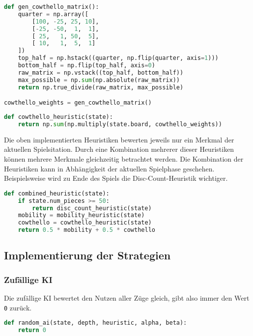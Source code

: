 \begin{lstlisting}[language=Python]
def gen_cowthello_matrix():
    quarter = np.array([
        [100, -25, 25, 10],
        [-25, -50,  1,  1],
        [ 25,   1, 50,  5],
        [ 10,   1,  5,  1]
    ])
    top_half = np.hstack((quarter, np.flip(quarter, axis=1)))
    bottom_half = np.flip(top_half, axis=0)
    raw_matrix = np.vstack((top_half, bottom_half))
    max_possible = np.sum(np.absolute(raw_matrix))
    return np.true_divide(raw_matrix, max_possible)

cowthello_weights = gen_cowthello_matrix()
\end{lstlisting}

\begin{lstlisting}[language=Python]
def cowthello_heuristic(state):
    return np.sum(np.multiply(state.board, cowthello_weights))
\end{lstlisting}

Die oben implementierten Heuristiken bewerten jeweils nur ein Merkmal
der aktuellen Spielsitation. Durch eine Kombination mehrerer dieser
Heuristiken können mehrere Merkmale gleichzeitig betrachtet werden. Die
Kombination der Heuristiken kann in Abhängigkeit der aktuellen
Spielphase geschehen. Beispielsweise wird zu Ende des Spiels die
Disc-Count-Heuristik wichtiger.

\begin{lstlisting}[language=Python]
def combined_heuristic(state):
    if state.num_pieces >= 50:
        return disc_count_heuristic(state)
    mobility = mobility_heuristic(state)
    cowthello = cowthello_heuristic(state)
    return 0.5 * mobility + 0.5 * cowthello
\end{lstlisting}

\hypertarget{implementierung-der-strategien}{%
\subsection{Implementierung der
Strategien}\label{implementierung-der-strategien}}

\hypertarget{zufuxe4llige-ki}{%
\subsubsection{Zufällige KI}\label{zufuxe4llige-ki}}

Die zufällige KI bewertet den Nutzen aller Züge gleich, gibt also immer
den Wert \passthrough{\lstinline!0!} zurück.

\begin{lstlisting}[language=Python]
def random_ai(state, depth, heuristic, alpha, beta):
    return 0
\end{lstlisting}

